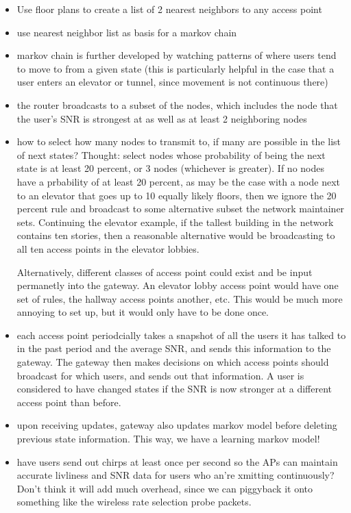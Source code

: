 \documentclass[letterpaper,12pt]{article}
\begin{document}
\begin{itemize}
\item Use floor plans to create a list of 2 nearest neighbors to any access point

\item use nearest neighbor list as basis for a markov chain

\item markov chain is further developed by watching patterns of where users tend 
to move to from a given state (this is particularly helpful in the case that a user
enters an elevator or tunnel, since movement is not continuous there)

\item the router broadcasts to a subset of the nodes, which includes the node 
that the user's SNR is strongest at as well as at least 2 neighboring nodes

\item how to select how many nodes to transmit to, if many are possible in the
list of next states? Thought: select nodes whose probability of being the next 
state is at least 20 percent, or 3 nodes (whichever is greater). If no nodes
have a prbability of at least 20 percent, as may be the case with a node next 
to an elevator that goes up to 10 equally likely floors, then we ignore the 20 
percent rule and broadcast to some alternative subset the network maintainer sets.
Continuing the elevator example, if the tallest building in the network contains
ten stories, then a reasonable alternative would be broadcasting to all ten
access points in the elevator lobbies.

Alternatively, different classes of access point could exist and be input
permanetly into the gateway. An elevator lobby access point would have one
set of rules, the hallway access points another, etc. This would be 
much more annoying to set up, but it would only have to be done once.

\item each access point periodcially takes a snapshot of all the users it has
talked to in the past period and the average SNR, and sends this information
to the gateway. The gateway then makes decisions on which access points
should broadcast for which users, and sends out that information.
A user is considered to  have changed states if the SNR is now stronger at a 
different access point than before. 

\item upon receiving updates, gateway also updates markov model before deleting
previous state information. This way, we have a learning markov model!

\item have users send out chirps at least once per second so the APs can 
maintain accurate livliness and SNR data for users who an're xmitting 
continuously? Don't think it will add much overhead, since we can piggyback 
it onto something like the wireless rate selection probe packets.

\end{itemize}
\end{document}

